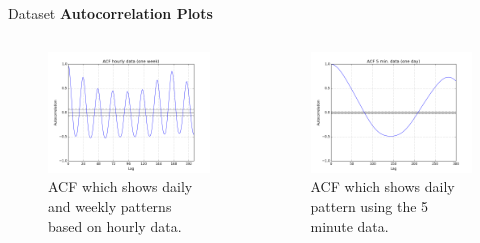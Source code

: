 \documentclass{beamer}
\begin{document}
    \begin{frame}{Dataset}   
    \textbf{Autocorrelation Plots}
    \begin{columns}[c]
      \begin{figure}
       \includegraphics[width=1.05\textwidth]{images/ACF_week.png}
       \caption{ACF which shows daily and weekly patterns based on hourly data.}
      \end{figure}

        \begin{figure}
         \includegraphics[width=1.05\textwidth]{images/ACF_day.png}
         \caption{ACF which shows daily pattern using the 5 minute data.}
        \end{figure}
    \end{columns}
  \end{frame}  
  
  
\end{document}
